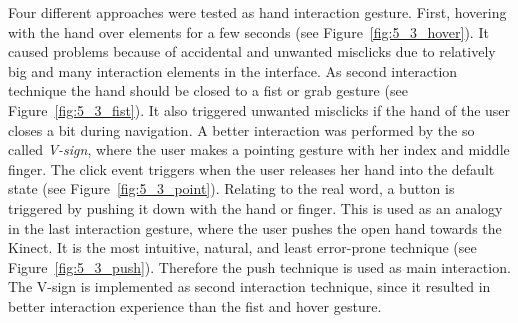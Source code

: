 Four different approaches were tested as hand interaction gesture.
First, hovering with the hand over elements for a few seconds (see Figure~\ref{fig:5_3_hover}).
It caused problems because of accidental and unwanted misclicks due to relatively big and many interaction elements in the interface.
As second interaction technique the hand should be closed to a fist or grab gesture (see Figure~\ref{fig:5_3_fist}).
It also triggered unwanted misclicks if the hand of the user closes a bit during navigation.
A better interaction was performed by the so called \textit{V-sign}, where the user makes a pointing gesture with her index and middle finger.
The click event triggers when the user releases her hand into the default state (see Figure~\ref{fig:5_3_point}).
Relating to the real word, a button is triggered by pushing it down with the hand or finger.
This is used as an analogy in the last interaction gesture, where the user pushes the open hand towards the Kinect.
It is the most intuitive, natural, and least error-prone technique (see Figure~\ref{fig:5_3_push}). %
Therefore the push technique is used as main interaction. The V-sign is implemented as second interaction technique, since it resulted in better interaction experience than the fist and hover gesture.
